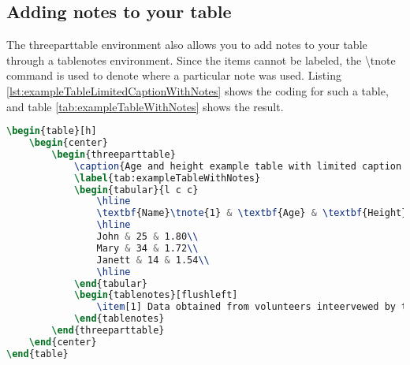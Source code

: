 		\subsection{Adding notes to your table}

	The {\ttfamily threeparttable} environment also allows you to add notes to your table through a {\ttfamily tablenotes} environment. Since the items cannot be labeled, the {\ttfamily \textbackslash tnote} command is used to denote where a particular note was used. Listing \ref{lst:exampleTableLimitedCaptionWithNotes} shows the coding for such a table, and table \ref{tab:exampleTableWithNotes} shows the result.

\begin{lstlisting}[caption = {Example table with limited caption width and notes. (table \ref{tab:exampleTableWithNotes})}, label = {lst:exampleTableLimitedCaptionWithNotes}, style = prettyListing, language = tex]
\begin{table}[h]
	\begin{center}
		\begin{threeparttable}
			\caption{Age and height example table with limited caption and notes.}
			\label{tab:exampleTableWithNotes}
			\begin{tabular}{l c c}
				\hline
				\textbf{Name}\tnote{1} & \textbf{Age} & \textbf{Height} (m) \\
				\hline
				John & 25 & 1.80\\
				Mary & 34 & 1.72\\
				Janett & 14 & 1.54\\
				\hline
			\end{tabular}
			\begin{tablenotes}[flushleft]
				\item[1] Data obtained from volunteers inteervewed by the authors.
			\end{tablenotes}
		\end{threeparttable}
	\end{center}
\end{table}
\end{lstlisting}


